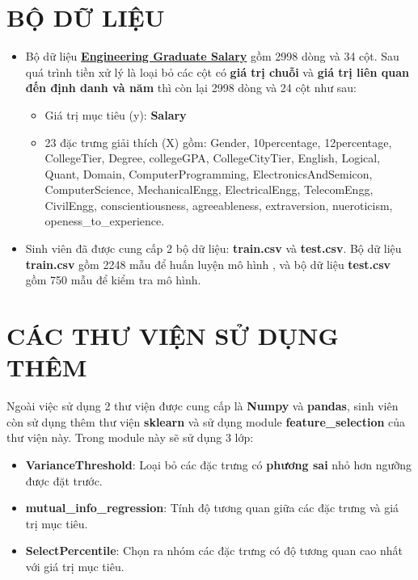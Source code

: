 \documentclass{report}
\begin{document}
\section{BỘ DỮ LIỆU}
\begin{itemize}
    \item  Bộ dữ liệu \textbf{\href{https://www.kaggle.com/datasets/manishkc06/engineering-graduate-salary-prediction}{Engineering Graduate Salary}} gồm 2998 dòng và 34 cột. Sau quá trình tiền xử lý là loại bỏ các cột có \textbf{giá trị chuỗi} và \textbf{giá trị liên quan đến định danh và năm} thì còn lại 2998 dòng và 24 cột như sau:
    \begin{itemize}
        \item Giá trị mục tiêu (y): \textbf{Salary}
        \item 23 đặc trưng giải thích (X) gồm: Gender, 10percentage, 12percentage, CollegeTier, Degree, collegeGPA, CollegeCityTier, English, Logical, Quant, Domain, ComputerProgramming, ElectronicsAndSemicon, ComputerScience, MechanicalEngg, ElectricalEngg, TelecomEngg, CivilEngg, conscientiousness, agreeableness, extraversion, nueroticism, openess\_to\_experience.
    \end{itemize}
    \item Sinh viên đã được cung cấp 2 bộ dữ liệu: \textbf{train.csv} và \textbf{test.csv}. Bộ dữ liệu \textbf{train.csv} gồm 2248 mẫu để huấn luyện mô hình , và bộ dữ liệu \textbf{test.csv} gồm 750 mẫu để kiểm tra mô hình.
\end{itemize}

\section{CÁC THƯ VIỆN SỬ DỤNG THÊM}
Ngoài việc sử dụng 2 thư viện được cung cấp là \textbf{Numpy} và \textbf{pandas}, sinh viên còn sử dụng thêm thư viện \textbf{sklearn} và sử dụng module \textbf{feature\_selection} của thư viện này. Trong module này sẽ sử dụng 3 lớp:
\begin{itemize}
    \item \textbf{VarianceThreshold}: Loại bỏ các đặc trưng có \textbf{phương sai} nhỏ hơn ngưỡng được đặt trước.
    \item \textbf{mutual\_info\_regression}: Tính độ tương quan giữa các đặc trưng và giá trị mục tiêu.
    \item \textbf{SelectPercentile}: Chọn ra nhóm các đặc trưng có độ tương quan cao nhất với giá trị mục tiêu.
\end{itemize}
\end{document}
